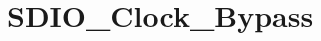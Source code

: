 \hypertarget{group___s_d_i_o___clock___bypass}{\section{S\-D\-I\-O\-\_\-\-Clock\-\_\-\-Bypass}
\label{group___s_d_i_o___clock___bypass}
}
